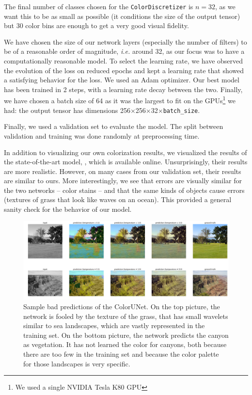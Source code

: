 \documentclass[10pt,twocolumn,letterpaper]{article}
\begin{document}
The final number of classes chosen for the \texttt{ColorDiscretizer} is $n=32$, as we want this to be as small as possible (it conditions the size of the output tensor) but 30 color bins are enough to get a very good visual fidelity.

We have chosen the size of our network layers (especially the number of filters) to be of a reasonable order of magnitude, \textit{i.e.} around 32, as our focus was to have a computationally reasonable model. To select the learning rate, we have observed the evolution of the loss on reduced epochs and kept a learning rate that showed a satisfying behavior for the loss. We used an Adam optimizer. Our best model has been trained in 2 steps, with a learning rate decay between the two. Finally, we have chosen a batch size of 64 as it was the largest to fit on the GPUs\footnote{We used a single NVIDIA Tesla K80 GPU} we had: the output tensor has dimensions 256$\times$256$\times$32$\times$\texttt{batch\_size}.

Finally, we used a validation set to evaluate the model. The split between validation and training  was done randomly at preprocessing time.

In addition to visualizing our own colorization results, we visualized the results of the state-of-the-art model, \cite{zhang2016colorful}, which is available online. Unsurprisingly, their results are more realistic. However, on many cases from our validation set, their results are similar to ours. More interestingly, we see that errors are visually similar for the two networks -- \ie color stains -- and that the same kinds of objects cause errors (\eg textures of grass that look like waves on an ocean). This provided a general sanity check for the behavior of our model.
\begin{figure}
\begin{center}
\includegraphics[width=450px]{worse}
\caption{Sample bad predictions of the ColorUNet. On the top picture, the network is fooled by the texture of the grass, that has small wavelets similar to sea landscapes, which are vastly represented in the training set. On the bottom picture, the network predicts the canyon as vegetation. It has not learned the color for canyons, both because there are too few in the training set and because the color palette for those landscapes is very specific.}
\label{worse}
\end{center}
\end{figure}
\end{document}
